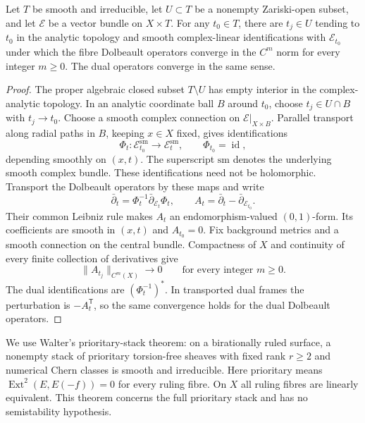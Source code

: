 \begin{lemma}\label{lem:dense-family-smooth-dolbeault-convergence}
Let $T$ be smooth and irreducible, let $U\subset T$ be a nonempty
Zariski-open subset, and let $\mathcal E$ be a vector bundle on
$X\times T$. For any $t_0\in T$, there are $t_j\in U$ tending to $t_0$
in the analytic topology and smooth complex-linear identifications with
$\mathcal E_{t_0}$ under which the fibre Dolbeault operators converge
in the $C^m$ norm for every integer $m\geq0$. The dual operators converge
in the same sense.
\end{lemma}
\begin{proof}
The proper algebraic closed subset $T\setminus U$ has empty interior
in the complex-analytic topology. In an analytic coordinate ball $B$
around $t_0$, choose $t_j\in U\cap B$ with $t_j\to t_0$.
Choose a smooth complex connection on $\mathcal E|_{X\times B}$.
Parallel transport along radial paths in $B$, keeping $x\in X$ fixed,
gives identifications
\[
 \Phi_t:\mathcal E_{t_0}^{\mathrm{sm}}\longrightarrow
          \mathcal E_t^{\mathrm{sm}},\qquad \Phi_{t_0}=\operatorname{id},
\]
depending smoothly on $(x,t)$. The superscript $\mathrm{sm}$ denotes
the underlying smooth complex bundle. These identifications need not
be holomorphic.
Transport the Dolbeault operators by these maps and write
\[
 \bar\partial_t=\Phi_t^{-1}\bar\partial_{\mathcal E_t}\Phi_t,
 \qquad A_t=\bar\partial_t-\bar\partial_{\mathcal E_{t_0}}.
\]
Their common Leibniz rule makes $A_t$ an endomorphism-valued $(0,1)$-form.
Its coefficients are smooth in $(x,t)$ and $A_{t_0}=0$. Fix background
metrics and a smooth connection on the central bundle. Compactness of
$X$ and continuity of every finite collection of derivatives give
\[
 \|A_{t_j}\|_{C^m(X)}\longrightarrow0
 \qquad\text{for every integer }m\geq0.
\]
The dual identifications are $(\Phi_t^{-1})^*$. In transported dual
frames the perturbation is $-A_t^{\mathsf T}$, so the same convergence
holds for the dual Dolbeault operators.
\end{proof}

We use Walter's prioritary-stack theorem: on a birationally ruled
surface, a nonempty stack of prioritary torsion-free sheaves with fixed
rank $r\geq2$ and numerical Chern classes is smooth and irreducible.
Here prioritary means $\operatorname{Ext}^2(E,E(-f))=0$ for every ruling
fibre. On $X$ all ruling fibres are linearly equivalent.
This theorem concerns the full prioritary stack and has no semistability
hypothesis.

